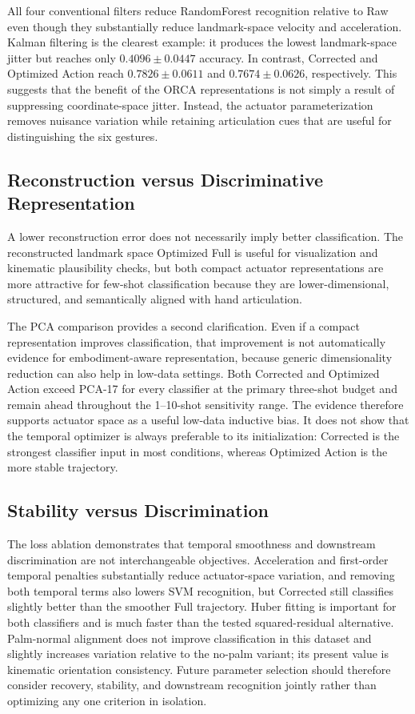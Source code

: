 \documentclass[11pt]{article}
\begin{document}
All four conventional filters reduce RandomForest recognition relative to Raw even though they substantially reduce landmark-space velocity and acceleration. Kalman filtering is the clearest example: it produces the lowest landmark-space jitter but reaches only $0.4096 \pm 0.0447$ accuracy. In contrast, Corrected and Optimized Action reach $0.7826 \pm 0.0611$ and $0.7674 \pm 0.0626$, respectively. This suggests that the benefit of the ORCA representations is not simply a result of suppressing coordinate-space jitter. Instead, the actuator parameterization removes nuisance variation while retaining articulation cues that are useful for distinguishing the six gestures.

\subsection{Reconstruction versus Discriminative Representation}
A lower reconstruction error does not necessarily imply better classification. The reconstructed landmark space Optimized Full is useful for visualization and kinematic plausibility checks, but both compact actuator representations are more attractive for few-shot classification because they are lower-dimensional, structured, and semantically aligned with hand articulation.

The PCA comparison provides a second clarification. Even if a compact representation improves classification, that improvement is not automatically evidence for embodiment-aware representation, because generic dimensionality reduction can also help in low-data settings. Both Corrected and Optimized Action exceed PCA-17 for every classifier at the primary three-shot budget and remain ahead throughout the 1--10-shot sensitivity range. The evidence therefore supports actuator space as a useful low-data inductive bias. It does not show that the temporal optimizer is always preferable to its initialization: Corrected is the strongest classifier input in most conditions, whereas Optimized Action is the more stable trajectory.

\subsection{Stability versus Discrimination}
The loss ablation demonstrates that temporal smoothness and downstream discrimination are not interchangeable objectives. Acceleration and first-order temporal penalties substantially reduce actuator-space variation, and removing both temporal terms also lowers SVM recognition, but Corrected still classifies slightly better than the smoother Full trajectory. Huber fitting is important for both classifiers and is much faster than the tested squared-residual alternative. Palm-normal alignment does not improve classification in this dataset and slightly increases variation relative to the no-palm variant; its present value is kinematic orientation consistency. Future parameter selection should therefore consider recovery, stability, and downstream recognition jointly rather than optimizing any one criterion in isolation.
\end{document}
